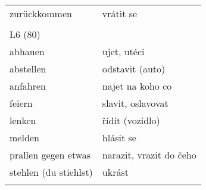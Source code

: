 \documentclass{article}
\begin{document}
\begin{tabular}{ p{5cm}|p{5cm}  }
    zurückkommen & vrátit se \\
    \\
    L6 (80) \\
    abhauen & ujet, utéci \\
    abstellen & odstavit (auto) \\
    anfahren & najet na koho co \\
    feiern & slavit, oslavovat \\
    lenken & řídit (vozidlo) \\
    melden & hlásit se \\
    prallen gegen etwas & narazit, vrazit do čeho \\
    stehlen (du stiehlst) & ukrást \\
    \\
   \end{tabular}
\end{document}
